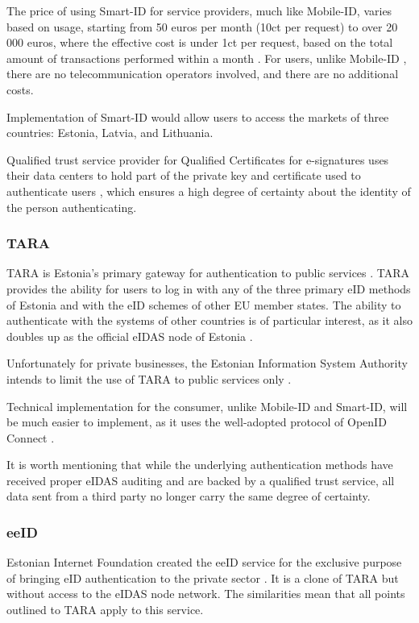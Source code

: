 The price of using Smart-ID for service providers, much like Mobile-ID, varies based on usage, starting from 50 euros per month (10ct per request) to over 20 000 euros, where the effective cost is under 1ct per request, based on the total amount of transactions performed within a month \cite{sk-smartidpricing}. For users, unlike Mobile-ID \cite{telia-mobileid}, there are no telecommunication operators involved, and there are no additional costs.

Implementation of Smart-ID would allow users to access the markets of three countries: Estonia, Latvia, and Lithuania.

Qualified trust service provider for Qualified Certificates for e-signatures uses their data centers to hold part of the private key and certificate used to authenticate users \cite{eu-trustservices}, which ensures a high degree of certainty about the identity of the person authenticating.

\subsubsection{TARA}

TARA is Estonia's primary gateway for authentication to public services \cite{tara}. TARA provides the ability for users to log in with any of the three primary eID methods of Estonia and with the eID schemes of other EU member states. The ability to authenticate with the systems of other countries is of particular interest, as it also doubles up as the official eIDAS node of Estonia \cite{tara}.

Unfortunately for private businesses, the Estonian Information System Authority intends to limit the use of TARA to public services only \cite{tara-business}.

Technical implementation for the consumer, unlike Mobile-ID and Smart-ID, will be much easier to implement, as it uses the well-adopted protocol of OpenID Connect \cite{tara-technical, oidc}.

It is worth mentioning that while the underlying authentication methods have received proper eIDAS auditing and are backed by a qualified trust service, all data sent from a third party no longer carry the same degree of certainty.

\subsubsection{eeID}

Estonian Internet Foundation created the eeID service for the exclusive purpose of bringing eID authentication to the private sector \cite{eeid}. It is a clone of TARA but without access to the eIDAS node network. The similarities mean that all points outlined to TARA apply to this service.

